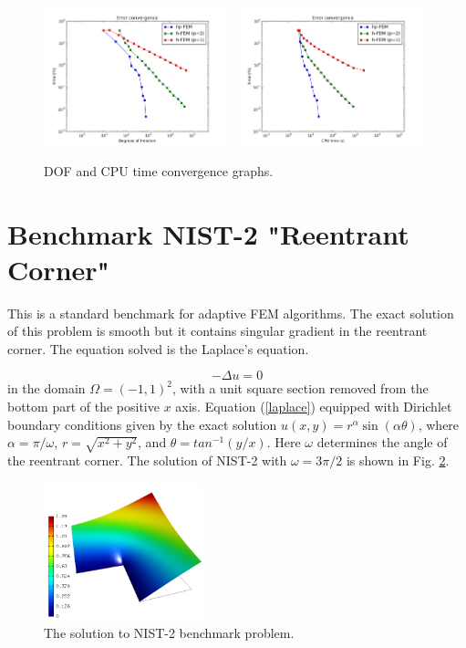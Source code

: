 \documentclass[12pt]{elsarticle}
\begin{document}
\begin{figure}[!ht]
\centering
\includegraphics[height=4cm]{nist/nist-1/conv_dof_aniso.png}\ \
\includegraphics[height=4cm]{nist/nist-1/conv_cpu_aniso.png}
\caption{DOF and CPU time convergence graphs.}
\label{fig:nist-1-conv}
\end{figure}




\section{Benchmark NIST-2 "Reentrant Corner"}
\label{sec:bench-2}

This is a standard benchmark for adaptive FEM algorithms.
The exact solution of this problem is smooth but it contains
singular gradient in the reentrant corner.
The equation solved is the Laplace's equation.

\begin{equation} \label{laplace}
-\Delta u = 0
\end{equation}
in the domain $\Omega = (-1, 1)^2$, with a unit square
section removed from the bottom part of the positive $x$ axis.
Equation (\ref{laplace}) equipped with Dirichlet
boundary conditions given by the exact solution
$u(x, y) = r^{\alpha}\sin(\alpha \theta)$,
where $\alpha = \pi / \omega$, $r = \sqrt{x^2+y^2}$,
and $\theta = tan^{-1}(y/x)$. Here $\omega $ determines
the angle of the reentrant corner.
The solution of NIST-2 with $\omega = 3 \pi / 2$
is shown in Fig. \ref{fig:sln-nist02}.

\begin{figure}[!ht]
\centering
\includegraphics[height=4cm]{nist/nist-2/solution.png}
\caption{The solution to NIST-2 benchmark problem.}
\label{fig:sln-nist02}
\end{figure}
\end{document}
